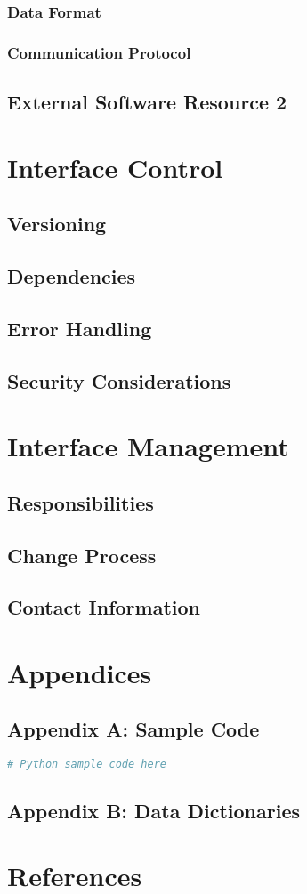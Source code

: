 \documentclass[11pt,a4paper]{article}
\begin{document}
\subsubsection{Data Format}
\subsubsection{Communication Protocol}

\subsection{External Software Resource 2}

\section{Interface Control}
\subsection{Versioning}
\subsection{Dependencies}
\subsection{Error Handling}
\subsection{Security Considerations}

\section{Interface Management}
\subsection{Responsibilities}
\subsection{Change Process}
\subsection{Contact Information}

\section{Appendices}
\subsection{Appendix A: Sample Code}
\begin{lstlisting}[language=Python]
# Python sample code here
\end{lstlisting}
\subsection{Appendix B: Data Dictionaries}

\section{References}

\end{document}
